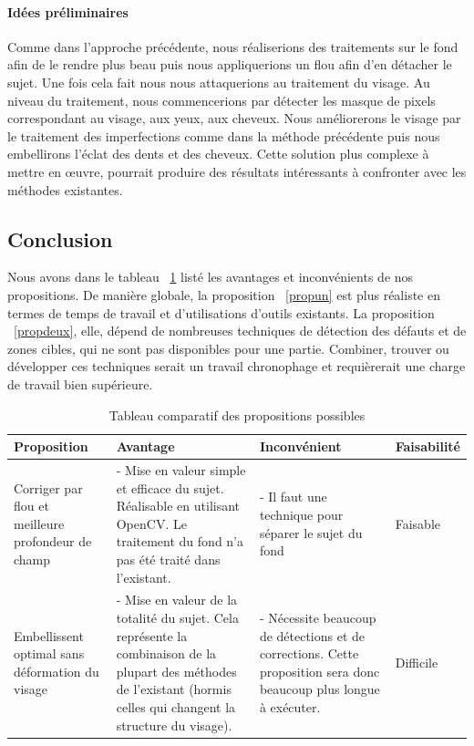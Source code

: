 \documentclass[11pt, french]{report-rd-info}
\begin{document}
\paragraph{Idées préliminaires}
Comme dans l’approche précédente, nous réaliserions des traitements sur le fond afin de le rendre plus beau puis nous appliquerions un flou afin d’en détacher le sujet. Une fois cela fait nous nous attaquerions au traitement du visage. Au niveau du traitement, nous commencerions par détecter les masque de pixels correspondant au visage, aux yeux, aux cheveux. Nous améliorerons le visage par le traitement des imperfections comme dans la méthode précédente puis nous embellirons l’éclat des dents et des cheveux.
Cette solution plus complexe à mettre en œuvre, pourrait produire des résultats intéressants à confronter avec les méthodes existantes.
\subsection{Conclusion}
Nous avons dans le tableau ~\ref{tab:compprop} listé les avantages et inconvénients de nos propositions. De manière globale, la proposition ~\ref{propun} est plus réaliste en termes de temps de travail et d’utilisations d’outils existants. La proposition ~\ref{propdeux}, elle, dépend de nombreuses techniques de détection des défauts et de zones cibles, qui ne sont pas disponibles pour une partie. Combiner, trouver ou développer ces techniques serait un travail chronophage et requièrerait une charge de travail bien supérieure.
\begin{table}
\begin{center}
\begin{tabular}{|p{3cm}|p{4cm}|p{4cm}|p{4cm}|}
\hline
Proposition & Avantage & Inconvénient & Faisabilité \\ \hline
Corriger par flou et meilleure profondeur de champ & - Mise en valeur simple et efficace du sujet. Réalisable en utilisant OpenCV. Le traitement du fond n'a pas été traité dans l'existant. & - Il faut une technique pour séparer le sujet du fond & Faisable \\ \hline
Embellissent optimal sans déformation du visage & - Mise en valeur de la totalité du sujet. Cela représente la combinaison de la plupart des méthodes de l'existant (hormis celles qui changent la structure du visage). & - Nécessite beaucoup de détections et de corrections. Cette proposition sera donc beaucoup plus longue à exécuter. & Difficile \\ \hline
\end{tabular}
\end{center}
\caption{Tableau comparatif des propositions possibles}
\label{tab:compprop}
\end{table}

\listoffigures{}
\listoftables{}
\appendix
\end{document}
